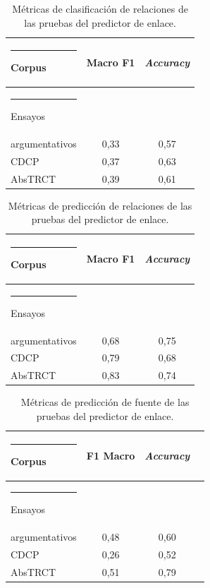 \documentclass[a4paper,11pt,twocolumn,twoside]{article}
\begin{document}
\begin{table}[h]
	\begin{center}
		\begin{tabular}{|l|c|c|} 
			\hline\rule{-2pt}{15pt}
			{\bf Corpus}                 & {\bf Macro F1} & {\bf \textit{Accuracy}} \\
			\hline\rule{-4pt}{10pt}
			Ensayos				 		 & 				  & 						\\ 
			argumentativos 		 		 & 0,33			  & 0,57					\\ 
			CDCP                   		 & 0,37			  & 0,63					\\ 
			AbsTRCT               		 & 0,39			  & 0,61					\\ 
			\hline
		\end{tabular}
	\end{center}
	\caption{\label{table:test_relation_metrics_link_predictor_relation_classification}Métricas de clasificación de relaciones de las pruebas del predictor de enlace.}
\end{table}

\begin{table}[h]
	\begin{center}
		\begin{tabular}{|l|c|c|} 
			\hline\rule{-2pt}{15pt}
			{\bf Corpus}                 & {\bf Macro F1}  & {\bf \textit{Accuracy}} \\
			\hline\rule{-4pt}{10pt}
			Ensayos 			 		 & 	               & 	                    \\ 
			argumentativos 				 & 0,68            & 0,75                   \\ 
			CDCP                   		 & 0,79            & 0,68                   \\ 
			AbsTRCT               		 & 0,83            & 0,74                   \\ 
			\hline
		\end{tabular}
	\end{center}
	\caption{\label{table:test_relation_metrics_link_predictor_link_prediction}Métricas de predicción de relaciones de las pruebas del predictor de enlace.}
\end{table}

\begin{table}[h]
	\begin{center}
		\begin{tabular}{|l|c|c|c|} 
			\hline\rule{-2pt}{15pt}
			{\bf Corpus}                 & {\bf F1 Macro} & {\bf \textit{Accuracy}} \\ 
			\hline\rule{-4pt}{10pt}
			Ensayos				   & 	      & 	            \\ 
			argumentativos		   & 0,48     & 0,60            \\ 
			CDCP                   & 0,26     & 0,52            \\ 
			AbsTRCT                & 0,51     & 0,79            \\ 
			\hline
		\end{tabular}
	\end{center}
	\caption{\label{table:test_source_metrics_link_predictor}Métricas de predicción de fuente de las pruebas del predictor de enlace.}
\end{table}
\end{document}
